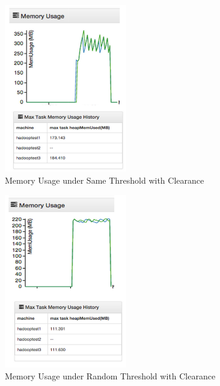 \begin{figure}[ht]
  \centering
    \includegraphics[width=2.1in]{image/test1c.png}
    \caption{Memory Usage under Same Threshold with Clearance}
    \label{ref:memory_allocation}
\end{figure}

\begin{figure}[ht]
  \centering
    \includegraphics[width=2.1in]{image/test1d.png}
    \caption{Memory Usage under Random Threshold with Clearance}
    \label{ref:memory_allocation}
\end{figure}